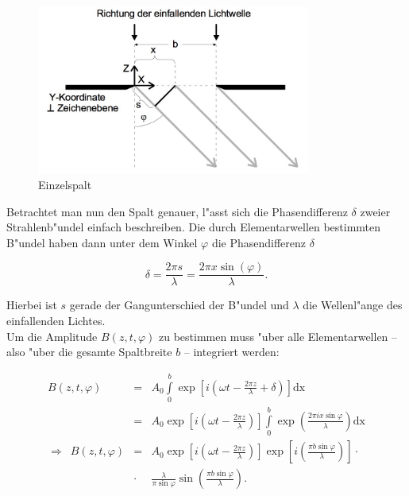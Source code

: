 		\begin{figure}[h]
				\centering
				\includegraphics[width = 9cm]{spalt.jpg}
				\caption{Einzelspalt}
				\label{abb_spalt}
		\end{figure}

		Betrachtet man nun den Spalt genauer, l"asst sich die Phasendifferenz $\delta$ zweier Strah\-len\-b"un\-del einfach beschreiben. Die durch Elementarwellen bestimmten B"undel haben dann unter dem Winkel $\varphi$ die Phasendifferenz $\delta$

		\begin{equation}
			\delta = \frac{2 \pi s}{\lambda} = \frac{2 \pi x \sin(\varphi)}{\lambda} .
		\end{equation}

		Hierbei ist $s$ gerade der Gangunterschied der B"undel und $\lambda$ die Wellenl"ange des ein\-fal\-len\-den Lichtes.\\
		Um die Amplitude $B(z, t, \varphi)$ zu bestimmen muss "uber alle Elementarwellen -- also "uber die gesamte Spaltbreite $b$ -- integriert werden:

		\begin{eqnarray}
			B(z, t, \varphi) &=& A_0 \int \limits_0^b \exp{\left[i \left(\omega t - \frac{2 \pi z}{\lambda} + \delta \right)\right]} \mathrm{dx} \nonumber \\
			&=& A_0 \exp{\left[i \left(\omega t - \frac{2 \pi z}{\lambda}\right)\right]} \int \limits_0^b \exp{\left(\frac{2 \pi i x \sin{\varphi}}{\lambda}\right)} \mathrm{dx} \nonumber\\
			\Rightarrow \enspace
			B(z, t, \varphi) &=& A_0 \exp{\left[ i \left( \omega t - \frac{2\pi z}{\lambda}
			\right) \right] } 
			\exp{\left[i \left( \frac{\pi b \sin{\varphi}}{\lambda} \right)\right]}  \cdot \nonumber \\
			&\cdot& \frac{\lambda}{\pi \sin{\varphi}}
			\sin{\left( \frac{\pi b \sin{\varphi}}{\lambda} \right)}
			.
			\label{eqn:allgemeine_lsg}
		\end{eqnarray}


